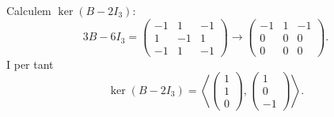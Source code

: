 \documentclass[12pt]{article}
\numberwithin{table}{section}
\numberwithin{figure}{section}
\numberwithin{equation}{section}
\begin{document}
\begin{enumerate}[label=(\alph*), font=\bfseries \sffamily, wide, labelwidth=!, labelindent=0pt]
		Calculem \( \ker{(B - 2I_3)} \):
		\begin{equation*}
			3B - 6I_3 = \begin{pmatrix}
				-1 & 1 & -1 \\
				1 & -1 & 1 \\
				-1 & 1 & -1
			\end{pmatrix} \to 
			\begin{pmatrix}
				-1 & 1 & -1 \\
				0 & 0 & 0 \\
				0 & 0 & 0
			\end{pmatrix}.
		\end{equation*}
		I per tant
		\begin{equation*}
			\ker{(B - 2I_3)} = \left\langle \begin{pmatrix}
					1\\1\\0
					\end{pmatrix}, \begin{pmatrix}
					1\\0\\-1
			\end{pmatrix} \right\rangle. 
		\end{equation*}


\end{enumerate}
\end{document}

